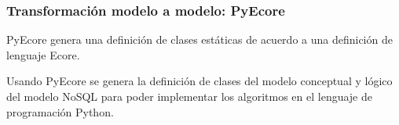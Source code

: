 \subsubsection*{Transformación modelo a modelo: PyEcore}\label{sec:xtend}
PyEcore genera una definición de clases estáticas de acuerdo a una definición de lenguaje Ecore.

Usando PyEcore se genera la definición de clases del modelo conceptual y lógico del modelo NoSQL para poder implementar los algoritmos en el lenguaje de programación Python.


